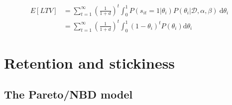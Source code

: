 \documentclass{tufte-book}
\begin{document}
\begin{align*}
  E\left[LTV\right] &= \sum_{t=1}^\infty \left(\frac{1}{1+d}\right)^t \int_0^1 P(s_{it}=1 | \theta_i)
  P(\theta_i|\mathcal{D}, \alpha, \beta)
  \: \mathrm{d} \theta_i\\
  & = \sum_{t=1}^\infty \left(\frac{1}{1+d}\right)^t \int_0^1 \left(1-\theta_i\right)^t P(\theta_i)
  \mathrm{d}\theta_i
\end{align*}
  
\section{Retention and stickiness}
\label{sec:retention_and_stickiness}

\subsection{The Pareto/NBD model}
\label{sub:the_pareto_nbd_model}
\end{document}

